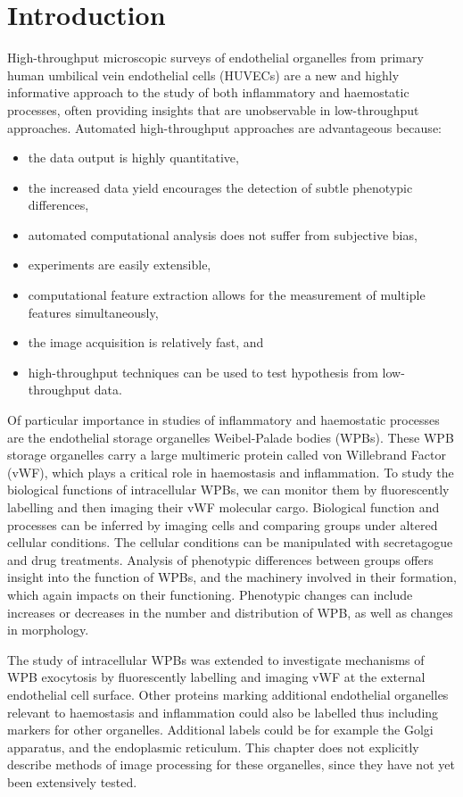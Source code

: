 \section{Introduction}
\label{endothelial_morphometry:introduction}
High-throughput microscopic surveys of endothelial organelles from primary human umbilical vein endothelial cells (HUVECs) are a new and highly informative approach to the study of both inflammatory and haemostatic processes, often providing insights that are unobservable in low-throughput approaches. Automated high-throughput approaches are advantageous because:
\begin{itemize}\setlength\itemsep{0pt}
	\item the data output is highly quantitative,
	\item the increased data yield encourages the detection of subtle phenotypic differences,
	\item automated computational analysis does not suffer from subjective bias,
	\item experiments are easily extensible,
	\item computational feature extraction allows for the measurement of multiple features simultaneously,
	\item the image acquisition is relatively fast, and
	\item high-throughput techniques can be used to test hypothesis from low-throughput data.
\end{itemize}

Of particular importance in studies of inflammatory and haemostatic processes are the endothelial storage organelles Weibel-Palade bodies (WPBs). These WPB storage organelles carry a large multimeric protein called von Willebrand Factor (vWF), which plays a critical role in haemostasis and inflammation. To study the biological functions of intracellular WPBs, we can monitor them by fluorescently labelling and then imaging their vWF molecular cargo. Biological function and processes can be inferred by imaging cells and comparing groups under altered cellular conditions. The cellular conditions can be manipulated with secretagogue and drug treatments. Analysis of phenotypic differences between groups offers insight into the function of WPBs, and the machinery involved in their formation, which again impacts on their functioning. Phenotypic changes can include increases or decreases in the number and distribution of WPB, as well as changes in morphology.

The study of intracellular WPBs was extended to investigate mechanisms of WPB exocytosis by fluorescently labelling and imaging vWF at the external endothelial cell surface. Other proteins marking additional endothelial organelles relevant to haemostasis and inflammation could also be labelled thus including markers for other organelles. Additional labels could be for example the Golgi apparatus, and the endoplasmic reticulum. This chapter does not explicitly describe methods of image processing for these organelles, since they have not yet been extensively tested.

